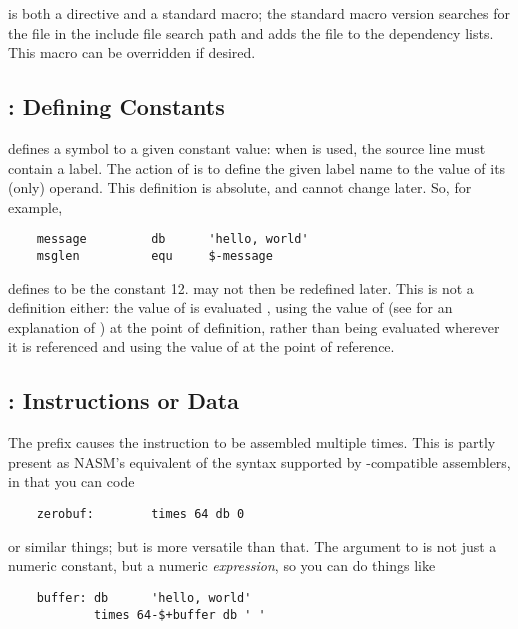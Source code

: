  is both a directive and a standard macro; the standard
macro version searches for the file in the include file search path
and adds the file to the dependency lists. This macro can be
overridden if desired.

\subsection{: Defining Constants}
\label{subsec:equ}

 defines a symbol to a given constant value: when  is
used, the source line must contain a label. The action of  is
to define the given label name to the value of its (only) operand.
This definition is absolute, and cannot change later. So, for
example,

\begin{lstlisting}
	message         db      'hello, world'
	msglen          equ     $-message
\end{lstlisting}

defines  to be the constant 12.  may
not then be redefined later. This is not a 
definition either: the value of  is evaluated ,
using the value of \code{\$} (see  for an explanation
of \code{\$}) at the point of definition, rather than being evaluated
wherever it is referenced and using the value of \code{\$} at
the point of reference.

\subsection{:  Instructions or Data}
\label{subsec:times}

The  prefix causes the instruction to be assembled multiple
times. This is partly present as NASM's equivalent of the 
syntax supported by -compatible assemblers, in that you can
code

\begin{lstlisting}
	zerobuf:        times 64 db 0
\end{lstlisting}

or similar things; but  is more versatile than that. The
argument to  is not just a numeric constant, but a numeric
\emph{expression}, so you can do things like

\begin{lstlisting}
	buffer: db      'hello, world'
	        times 64-$+buffer db ' '
\end{lstlisting}

